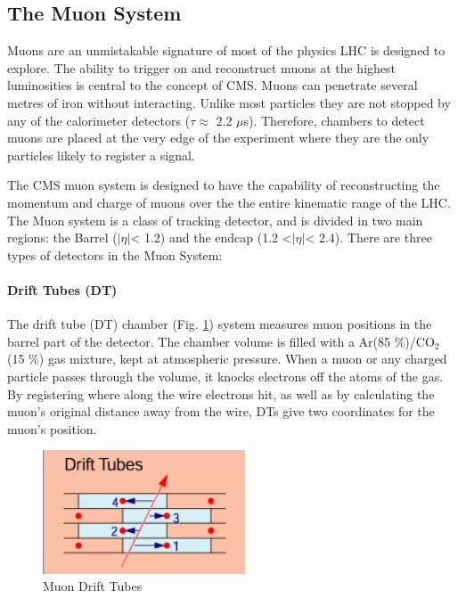 \subsection{The Muon System}

Muons are an unmistakable signature of most of the physics LHC is designed to explore. The ability to trigger on and reconstruct muons at the highest luminosities is central to the concept of CMS. Muons can penetrate several metres of iron without interacting. Unlike most particles they are not stopped by any of the calorimeter detectors ($\tau \approx$ 2.2 $\mu$s). Therefore, chambers to detect muons are placed at the very edge of the experiment where they are the only particles likely to register a signal. 

The CMS muon system is designed to have the capability of reconstructing the momentum and charge of muons over the the entire kinematic range of the LHC. The Muon system is a class of tracking detector, and is divided in two main regions: the Barrel ($|\eta|$< 1.2) and  the endcap (1.2 <$|\eta|$< 2.4). There are three types of detectors in the Muon System:

\paragraph{Drift Tubes (DT)}
The drift tube (DT) chamber (Fig. \ref{fig:DT}) system measures muon positions in the barrel part of the detector. The chamber volume is filled with a Ar(85 $\%$)/CO$_{2}$(15 $\%$) gas mixture, kept at atmospheric pressure.  When a muon or any charged particle passes through the volume, it knocks electrons off the atoms of the gas. By registering where along the wire electrons hit, as well as by calculating the muon's original distance away from the wire, DTs give two coordinates for the muon’s position.
\begin{figure}[H]
  \caption{Muon Drift Tubes \label{fig:DT}}
  \centering
\includegraphics[width=6cm]{CMS_chapter_plots/DT}
\end{figure}
